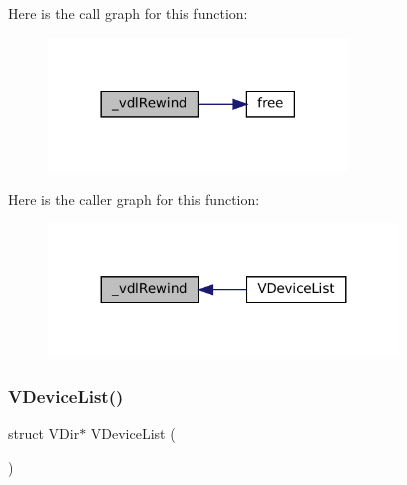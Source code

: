Here is the call graph for this function\+:
\nopagebreak
\begin{figure}[H]
\begin{center}
\leavevmode
\includegraphics[width=225pt]{vfs-devlist_8c_a0b42c631e426ff8d4ca9610a378e1668_cgraph}
\end{center}
\end{figure}
Here is the caller graph for this function\+:
\nopagebreak
\begin{figure}[H]
\begin{center}
\leavevmode
\includegraphics[width=263pt]{vfs-devlist_8c_a0b42c631e426ff8d4ca9610a378e1668_icgraph}
\end{center}
\end{figure}
\mbox{\label{vfs-devlist_8c_a36b1aed5737fa71dced20925de25a143}} 
\subsubsection{\texorpdfstring{V\+Device\+List()}{VDeviceList()}}
{\footnotesize\ttfamily struct V\+Dir$\ast$ V\+Device\+List (\begin{DoxyParamCaption}{ }\end{DoxyParamCaption})}

